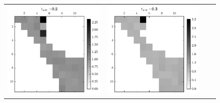 \begin{figure}[h]
  \centering
  \begin{tabular}{cccc}
    \includegraphics[scale=0.75]{images/results/matshows/homog_sp0_matshow_1}
    &
    \includegraphics[scale=0.75]{images/results/matshows/homog_sp0_matshow_2}

\end{tabular}
\end{figure}
